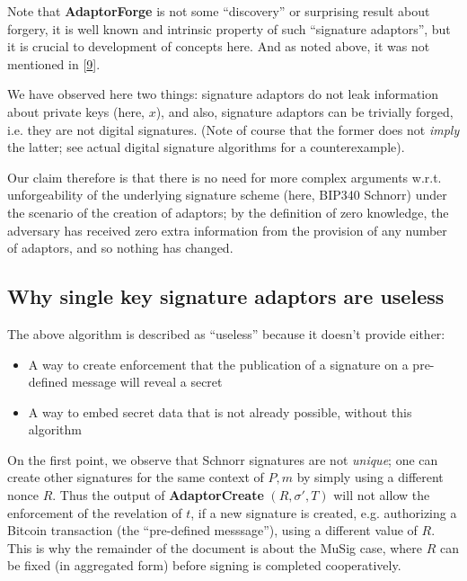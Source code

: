\documentclass[10pt,a4paper]{article}
\begin{document}
\vspace{5 pt}

Note that \textbf{AdaptorForge} is not some ``discovery'' or surprising result about forgery, it is well known and intrinsic property of such ``signature adaptors'', but it is crucial to development of concepts here. And as noted above, it was not mentioned in {[}\protect\hyperlink{anchor-9}{9}{]}.

\vspace{5 pt}

We have observed here two things: signature adaptors do not leak information about private keys (here, $x$), and also, signature adaptors can be trivially forged, i.e. they are not digital signatures. (Note of course that the former does not \emph{imply} the latter; see actual digital signature algorithms for a counterexample).

\vspace{5 pt}

Our claim therefore is that there is no need for more complex arguments w.r.t. unforgeability of the underlying signature scheme (here, BIP340 Schnorr) under the scenario of the creation of adaptors; by the definition of zero knowledge, the adversary has received zero extra information from the provision of any number of adaptors, and so nothing has changed.

\subsection{Why single key signature adaptors are useless}

The above algorithm is described as ``useless'' because it doesn't provide either:

\begin{itemize}
\item A way to create enforcement that the publication of a signature on a pre-defined message will reveal a secret
\item A way to embed secret data that is not already possible, without this algorithm
\end{itemize}

On the first point, we observe that Schnorr signatures are not \emph{unique}; one can create other signatures for the same context of $P, m$ by simply using a different nonce $R$. Thus the output of \textbf{AdaptorCreate} $(R, \sigma', T)$ will not allow the enforcement of the revelation of $t$, if a new signature is created, e.g. authorizing a Bitcoin transaction (the ``pre-defined messsage''), using a different value of $R$. This is why the remainder of the document is about the MuSig case, where $R$ can be fixed (in aggregated form) before signing is completed cooperatively.
\end{document}
